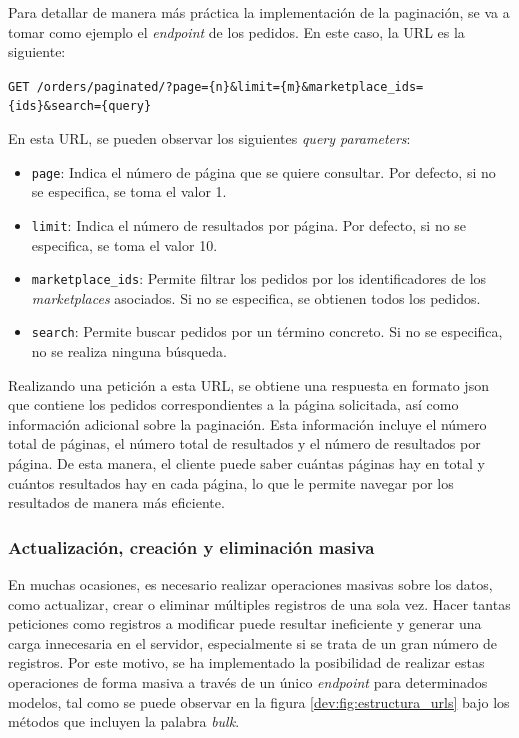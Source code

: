 Para detallar de manera más práctica la implementación de la paginación, se va a tomar como ejemplo el \textit{endpoint} de los pedidos. En este caso, la URL es la siguiente:

\begin{center}
    \texttt{GET /orders/paginated/?page=\{n\}\&limit=\{m\}\&marketplace\_ids=\{ids\}\&search=\{query\}}
\end{center}

En esta URL, se pueden observar los siguientes \textit{query parameters}:
\begin{itemize}
    \item \texttt{page}: Indica el número de página que se quiere consultar. Por defecto, si no se especifica, se toma el valor 1.
    \item \texttt{limit}: Indica el número de resultados por página. Por defecto, si no se especifica, se toma el valor 10.
    \item \texttt{marketplace\_ids}: Permite filtrar los pedidos por los identificadores de los \textit{marketplaces} asociados. Si no se especifica, se obtienen todos los pedidos.
    \item \texttt{search}: Permite buscar pedidos por un término concreto. Si no se especifica, no se realiza ninguna búsqueda.
\end{itemize}

Realizando una petición a esta URL, se obtiene una respuesta en formato \gls{json} que contiene los pedidos correspondientes a la página solicitada, así como información adicional sobre la paginación. Esta información incluye el número total de páginas, el número total de resultados y el número de resultados por página. De esta manera, el cliente puede saber cuántas páginas hay en total y cuántos resultados hay en cada página, lo que le permite navegar por los resultados de manera más eficiente.

\subsubsection{Actualización, creación y eliminación masiva}
\label{dev:subsubsec:actualizacion_creacion_eliminacion_masiva}

En muchas ocasiones, es necesario realizar operaciones masivas sobre los datos, como actualizar, crear o eliminar múltiples registros de una sola vez. Hacer tantas peticiones como registros a modificar puede resultar ineficiente y generar una carga innecesaria en el servidor, especialmente si se trata de un gran número de registros. Por este motivo, se ha implementado la posibilidad de realizar estas operaciones de forma masiva a través de un único \textit{endpoint} para determinados modelos, tal como se puede observar en la figura \ref{dev:fig:estructura_urls} bajo los métodos que incluyen la palabra \textit{bulk}.

